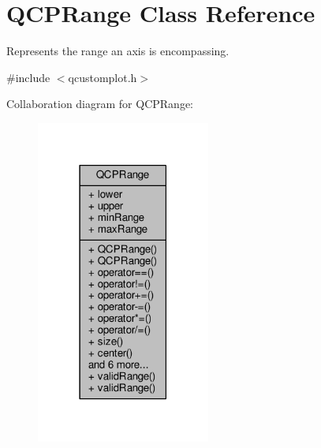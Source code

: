 \hypertarget{class_q_c_p_range}{}\section{Q\+C\+P\+Range Class Reference}
\label{class_q_c_p_range}


Represents the range an axis is encompassing.  




{\ttfamily \#include $<$qcustomplot.\+h$>$}



Collaboration diagram for Q\+C\+P\+Range\+:\nopagebreak
\begin{figure}[H]
\begin{center}
\leavevmode
\includegraphics[width=162pt]{class_q_c_p_range__coll__graph}
\end{center}
\end{figure}
